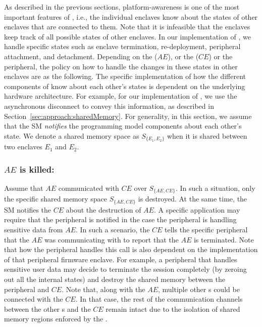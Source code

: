 As described in the previous sections, platform-awareness is one of the most important features of \Nameenclave, i.e., the individual enclaves know about the states of other enclaves that are connected to them. Note that it is infeasible that the enclaves keep track of all possible states of other enclaves. In our implementation of \name, we handle specific states such as enclave termination, re-deployment, peripheral attachment, and detachment. Depending on the \app ($AE$), or the \ce ($CE$) or the peripheral, the policy on how to handle the changes in these states in other enclaves are as the following. The specific implementation of how the different components of \Nameenclave know about each other's states is dependent on the underlying hardware architecture. For example, for our implementation of \name, we use the asynchronous disconnect to convey this information, as described in Section~\ref{sec:approach:sharedMemory}. For generality, in this section, we assume that the SM \emph{notifies} the programming model components about each other's state. We denote a shared memory space as $S_{\{E_1, E_2\}}$ when it is shared between two enclaves $E_1$ and $E_2$.


\subsubsection{$AE$ is killed:} Assume that $AE$ communicated with $CE$ over $S_{\{AE, CE\}}$. In such a situation, only the specific shared memory space $S_{\{AE, CE\}}$ is destroyed. At the same time, the SM notifies the $CE$ about the destruction of $AE$. A specific application may require that the peripheral is notified in the case the peripheral is handling sensitive data from $AE$. In such a scenario, the $CE$ tells the specific peripheral that the $AE$ was communicating with to report that the $AE$ is terminated. Note that how the peripheral handles this call is also dependent on the implementation of that peripheral firmware enclave. For example, a peripheral that handles sensitive user data may decide to terminate the session completely (by zeroing out all the internal states) and destroy the shared memory between the peripheral and $CE$. Note that, along with the $AE$, multiple other \app{}s could be connected with the $CE$. In that case, the rest of the communication channels between the other \app{}s and the $CE$ remain intact due to the isolation of shared memory regions enforced by the \ce.
    
